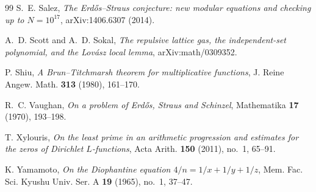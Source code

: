 \documentclass[10pt,reqno]{amsart}
\theoremstyle{definition}
\newcommand{\1}{\mathbf 1}
\begin{document}
\begin{thebibliography}{99}
S.~E. Salez,
\emph{The Erd\H{o}s--Straus conjecture: new modular equations and checking up to $N=10^{17}$},
arXiv:1406.6307 (2014).

A.~D. Scott and A.~D. Sokal,
\emph{The repulsive lattice gas, the independent-set polynomial, and the Lov\'asz local lemma},
arXiv:math/0309352.

P. Shiu,
\emph{A Brun--Titchmarsh theorem for multiplicative functions},
J. Reine Angew. Math. \textbf{313} (1980), 161--170.

R.~C. Vaughan,
\emph{On a problem of Erd\H{o}s, Straus and Schinzel},
Mathematika \textbf{17} (1970), 193--198.

T. Xylouris,
\emph{On the least prime in an arithmetic progression and estimates for the
zeros of Dirichlet $L$-functions},
Acta Arith. \textbf{150} (2011), no.~1, 65--91.

K. Yamamoto,
\emph{On the Diophantine equation $4/n=1/x+1/y+1/z$},
Mem. Fac. Sci. Kyushu Univ. Ser. A \textbf{19} (1965), no.~1, 37--47.

\end{thebibliography}
\end{document}
